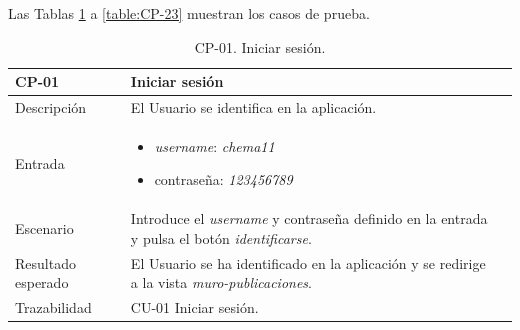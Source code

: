 Las Tablas \ref{table:CP-01} a \ref{table:CP-23} muestran los casos de prueba. 

\begin{table}[H]
    \centering
    \begin{tabularx}{1\textwidth} { 
        | >{\raggedright\arraybackslash}X 
        | >{\raggedright\arraybackslash}X 
        | >{\raggedright\arraybackslash}X 
        |  }
    \hline
    \textbf{CP-01}     & \textbf{Iniciar sesión}                             \\ \hline
    Descripción        & El Usuario se identifica en la aplicación.      \\ \hline
    Entrada            &  \begin{itemize}
        \item \textit{username}: \textit{chema11}
        \item contraseña: \textit{123456789}
    \end{itemize}\\ \hline
    Escenario          & Introduce el \textit{username} y contraseña definido en la entrada y pulsa el botón \textit{identificarse}.                            \\ \hline
    Resultado esperado & El Usuario se ha identificado en la aplicación y se redirige a la vista \textit{muro-publicaciones}. \\ \hline
    Trazabilidad & CU-01 Iniciar sesión. \\ \hline
    \end{tabularx}
    \caption{CP-01. Iniciar sesión.}
    \label{table:CP-01}
    \end{table}

